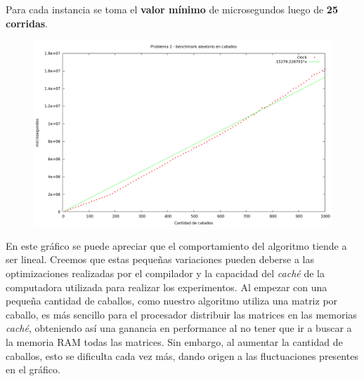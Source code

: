 Para cada instancia se toma el \textbf{valor mínimo} de microsegundos luego de
\textbf{25 corridas}.

\vspace*{0.5cm}

\begin{figure}[h]
  \begin{center}
    \includegraphics[scale=0.35]{imagenes/grafico-2-k.png}
  \end{center}
\end{figure}

\vspace{0.5cm}

En este gráfico se puede apreciar que el comportamiento del algoritmo tiende a
ser lineal. Creemos que estas pequeñas variaciones pueden deberse a las
optimizaciones realizadas por el compilador y la capacidad del \textit{caché}
de la computadora utilizada para realizar los experimentos. Al empezar con una
pequeña cantidad de caballos, como nuestro algoritmo utiliza una matriz por
caballo, es más sencillo para el procesador distribuir las matrices en las
memorias \textit{caché}, obteniendo así una ganancia en performance al no
tener que ir a buscar a la memoria RAM todas las matrices. Sin embargo, al
aumentar la cantidad de caballos, esto se dificulta cada vez más, dando origen
a las fluctuaciones presentes en el gráfico.
